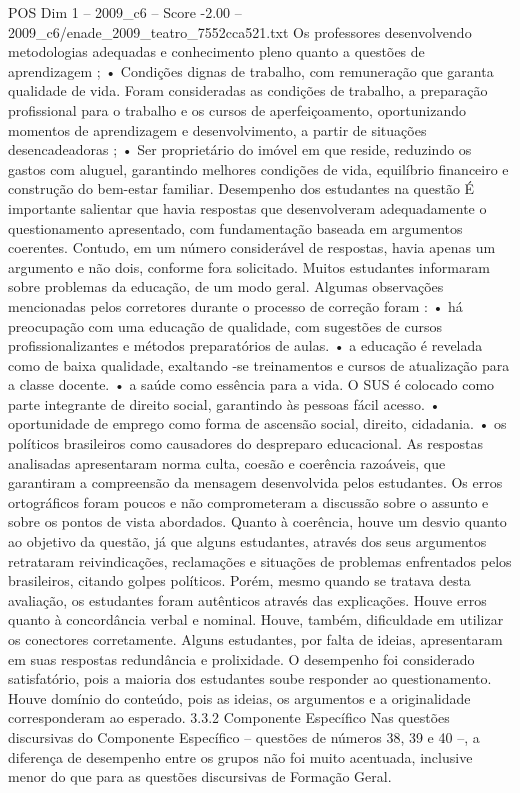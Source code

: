 \begin{textsample}{POS Dim 1 – 2009\_c6 – Score -2.00 – 2009\_c6/enade\_2009\_teatro\_7552cca521.txt}
Os professores desenvolvendo metodologias adequadas e conhecimento pleno quanto a questões de aprendizagem ; • Condições dignas de trabalho, com remuneração que garanta qualidade de vida.
Foram consideradas as condições de trabalho, a preparação profissional para o trabalho e os cursos de aperfeiçoamento, oportunizando momentos de aprendizagem e desenvolvimento, a partir de situações desencadeadoras ; • Ser proprietário do imóvel em que reside, reduzindo os gastos com aluguel, garantindo melhores condições de vida, equilíbrio financeiro e construção do bem-estar familiar.
Desempenho dos estudantes na questão É importante salientar que havia respostas que desenvolveram adequadamente o questionamento apresentado, com fundamentação baseada em argumentos coerentes.
Contudo, em um número considerável de respostas, havia apenas um argumento e não dois, conforme fora solicitado.
Muitos estudantes informaram sobre problemas da educação, de um modo geral.
Algumas observações mencionadas pelos corretores durante o processo de correção foram : • há preocupação com uma educação de qualidade, com sugestões de cursos profissionalizantes e métodos preparatórios de aulas. • a educação é revelada como de baixa qualidade, exaltando -se treinamentos e cursos de atualização para a classe docente. • a saúde como essência para a vida.
O SUS é colocado como parte integrante de direito social, garantindo às pessoas fácil acesso. • oportunidade de emprego como forma de ascensão social, direito, cidadania. • os políticos brasileiros como causadores do despreparo educacional.
As respostas analisadas apresentaram norma culta, coesão e coerência razoáveis, que garantiram a compreensão da mensagem desenvolvida pelos estudantes.
Os erros ortográficos foram poucos e não comprometeram a discussão sobre o assunto e sobre os pontos de vista abordados.
Quanto à coerência, houve um desvio quanto ao objetivo da questão, já que alguns estudantes, através dos seus argumentos retrataram reivindicações, reclamações e situações de problemas enfrentados pelos brasileiros, citando golpes políticos.
Porém, mesmo quando se tratava desta avaliação, os estudantes foram autênticos através das explicações.
Houve erros quanto à concordância verbal e nominal.
Houve, também, dificuldade em utilizar os conectores corretamente.
Alguns estudantes, por falta de ideias, apresentaram em suas respostas redundância e prolixidade.
O desempenho foi considerado satisfatório, pois a maioria dos estudantes soube responder ao questionamento.
Houve domínio do conteúdo, pois as ideias, os argumentos e a originalidade corresponderam ao esperado. 3.3.2 Componente Específico Nas questões discursivas do Componente Específico – questões de números 38, 39 e 40 –, a diferença de desempenho entre os grupos não foi muito acentuada, inclusive menor do que para as questões discursivas de Formação Geral.

\end{textsample}
